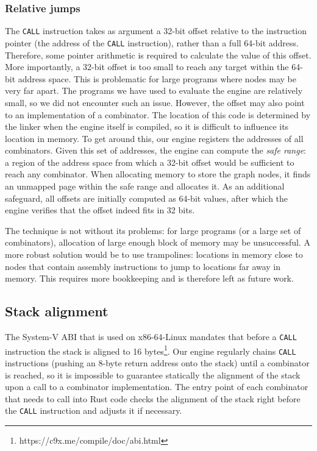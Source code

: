 \documentclass[conference]{IEEEtran}
\begin{document}
\subsubsection{Relative jumps}
The \texttt{CALL} instruction takes as argument a 32-bit offset relative to the instruction pointer (the address of the \texttt{CALL} instruction), rather than a full 64-bit address.
Therefore, some pointer arithmetic is required to calculate the value of this offset.
More importantly, a 32-bit offset is too small to reach any target within the 64-bit address space.
This is problematic for large programs where nodes may be very far apart.
The programs we have used to evaluate the engine are relatively small, so we did not encounter such an issue.
However, the offset may also point to an implementation of a combinator.
The location of this code is determined by the linker when the engine itself is compiled, so it is difficult to influence its location in memory.
To get around this, our engine registers the addresses of all combinators.
Given this set of addresses, the engine can compute the \emph{safe range}: a region of the address space from which a 32-bit offset would be sufficient to reach any combinator.
When allocating memory to store the graph nodes, it finds an unmapped page within the safe range and allocates it.
As an additional safeguard, all offsets are initially computed as 64-bit values, after which the engine verifies that the offset indeed fits in 32 bits.

The technique is not without its problems: for large programs (or a large set of combinators), allocation of large enough block of memory may be unsuccessful.
A more robust solution would be to use trampolines: locations in memory close to nodes that contain assembly instructions to jump to locations far away in memory.
This requires more bookkeeping and is therefore left as future work.

\subsection{Stack alignment}
The System-V ABI that is used on x86-64-Linux mandates that before a \texttt{CALL} instruction the stack is aligned to 16 bytes\footnote{https://c9x.me/compile/doc/abi.html}.
Our engine regularly chains \texttt{CALL} instructions (pushing an 8-byte return address onto the stack) until a combinator is reached, so it is impossible to guarantee statically the alignment of the stack upon a call to a combinator implementation.
The entry point of each combinator that needs to call into Rust code checks the alignment of the stack right before the \texttt{CALL} instruction and adjusts it if necessary.
\end{document}

